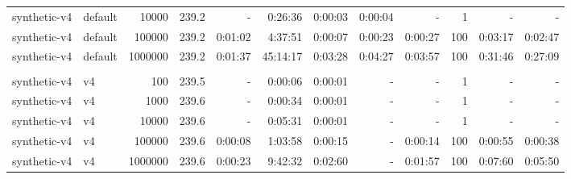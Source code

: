 \begin{table}
\begin{center}
\begin{tabular}{llrr|rrrrr|rrr}
synthetic-v4    & default  &   10000 &  239.2 &         - &   0:26:36 &   0:00:03 &   0:00:04 &         - &   1 &         - &         - \\
synthetic-v4    & default  &  100000 &  239.2 &   0:01:02 &   4:37:51 &   0:00:07 &   0:00:23 &   0:00:27 & 100 &   0:03:17 &   0:02:47 \\
synthetic-v4    & default  & 1000000 &  239.2 &   0:01:37 &  45:14:17 &   0:03:28 &   0:04:27 &   0:03:57 & 100 &   0:31:46 &   0:27:09 \\
& & & & & & & & & & \\
synthetic-v4    & v4       &     100 &  239.5 &         - &   0:00:06 &   0:00:01 &         - &         - &   1 &         - &         - \\
synthetic-v4    & v4       &    1000 &  239.6 &         - &   0:00:34 &   0:00:01 &         - &         - &   1 &         - &         - \\
synthetic-v4    & v4       &   10000 &  239.6 &         - &   0:05:31 &   0:00:01 &         - &         - &   1 &         - &         - \\
synthetic-v4    & v4       &  100000 &  239.6 &   0:00:08 &   1:03:58 &   0:00:15 &         - &   0:00:14 & 100 &   0:00:55 &   0:00:38 \\
synthetic-v4    & v4       & 1000000 &  239.6 &   0:00:23 &   9:42:32 &   0:02:60 &         - &   0:01:57 & 100 &   0:07:60 &   0:05:50 \\ \hline
\end{tabular}
\end{center}
\end{table}
